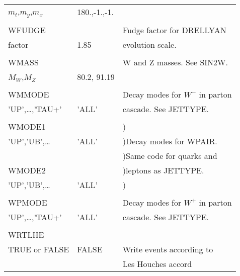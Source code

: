 \begin{center}
\begin{tabular}{lll}
$m_t$,$m_y$,$m_x$      & 180.,-1.,-1.      &                                \\
                       &                   &                                \\
WFUDGE                 &                   & Fudge factor for DRELLYAN      \\
factor                 & 1.85              & evolution scale.               \\
                       &                   &                                \\
WMASS                  &                   & W and Z masses. See SIN2W.     \\
$M_W$,$M_Z$            & 80.2, 91.19       &                                \\
                       &                   &                                \\
WMMODE                 &                   & Decay modes for $W^-$ in parton\\
'UP',\dots,'TAU+'      & 'ALL'             & cascade. See JETTYPE.          \\
                       &                   &                                \\
WMODE1                 &                   & )                              \\
'UP','UB',\dots        & 'ALL'             & )Decay modes for WPAIR.        \\
                       &                   & )Same code for quarks and      \\
WMODE2                 &                   & )leptons as JETTYPE.           \\
'UP','UB',\dots        & 'ALL'             & )                              \\
                       &                   &                                \\
WPMODE                 &                   & Decay modes for $W^+$ in parton\\
'UP',\dots,'TAU+'      & 'ALL'             & cascade. See JETTYPE.          \\
                       &                   &                                \\
WRTLHE                 &                   &                                \\
TRUE or FALSE          & FALSE             & Write events according to      \\
                       &                   & Les Houches accord             \\
\hline\hline
\end{tabular}
\end{center}

